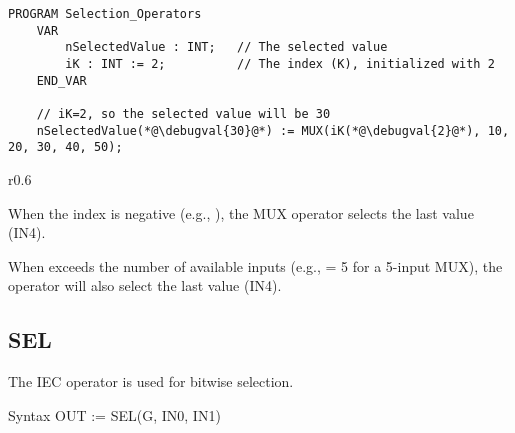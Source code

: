 \begin{lstlisting}[language=ST]
	PROGRAM Selection_Operators
	VAR
		nSelectedValue : INT;   // The selected value
		iK : INT := 2;          // The index (K), initialized with 2
	END_VAR
	
	// iK=2, so the selected value will be 30
	nSelectedValue(*@\debugval{30}@*) := MUX(iK(*@\debugval{2}@*), 10, 20, 30, 40, 50);  
\end{lstlisting}
\begin{wraptable}{r}{0.6 \textwidth} %
	\centering
	\vspace{-25pt} %
\end{wraptable}


When the index  is negative (e.g.,   ), the MUX operator selects the last value (IN4).

When  exceeds the number of available inputs (e.g.,   = 5 for a 5-input MUX), the operator will also select the last value (IN4).

\subsection{SEL}

The IEC operator is used for bitwise selection.

\begin{Box1}{Syntax}
	OUT := SEL(G, IN0, IN1)
\end{Box1}


